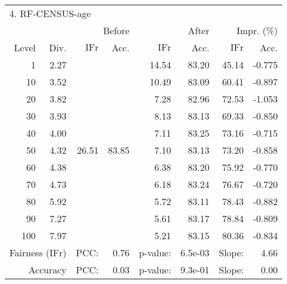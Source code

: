 \begin{tabular}{rr||rr|rr|rr}
\multicolumn{4}{l}{4. RF-CENSUS-age} & \multicolumn{2}{c}{} & \multicolumn{2}{c}{}\\
 &  & \multicolumn{2}{r|}{Before} & \multicolumn{2}{r|}{After} & \multicolumn{2}{r}{Impr. (\%)}\\
Level & Div. & $\mathrm{IFr}$ & Acc. & $\mathrm{IFr}$ & Acc. & $\mathrm{IFr}$ & Acc.\\
\hline
1 & 2.27 & \multirow{11}{*}{26.51} & \multirow{11}{*}{83.85} & 14.54 & 83.20 & 45.14 & -0.775\\
10 & 3.52 &  &  & 10.49 & 83.09 & 60.41 & -0.897\\
20 & 3.82 &  &  & 7.28 & 82.96 & 72.53 & -1.053\\
30 & 3.93 &  &  & 8.13 & 83.13 & 69.33 & -0.850\\
40 & 4.00 &  &  & 7.11 & 83.25 & 73.16 & -0.715\\
50 & 4.32 &  &  & 7.10 & 83.13 & 73.20 & -0.858\\
60 & 4.38 &  &  & 6.38 & 83.20 & 75.92 & -0.770\\
70 & 4.73 &  &  & 6.18 & 83.24 & 76.67 & -0.720\\
80 & 5.92 &  &  & 5.72 & 83.11 & 78.43 & -0.882\\
90 & 7.27 &  &  & 5.61 & 83.17 & 78.84 & -0.809\\
100 & 7.97 &  &  & 5.21 & 83.15 & 80.36 & -0.834\\
\hline
\multicolumn{2}{r}{Fairness ($\mathrm{IFr}$)} & PCC: & \multicolumn{1}{r}{0.76} & p-value:  & \multicolumn{1}{r}{6.5e-03} & Slope:  & 4.66\\
\multicolumn{2}{r}{Accuracy} & PCC: & \multicolumn{1}{r}{0.03} & p-value:  & \multicolumn{1}{r}{9.3e-01} & Slope:  & 0.00\\
\end{tabular}
